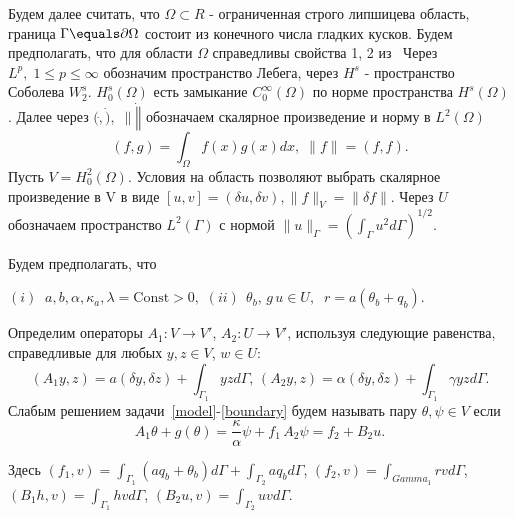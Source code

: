 Будем далее считать, что $\Omega \subset R$ - ограниченная строго липшицева область,
граница $\Gamma \equals \partial \Omega$ состоит из конечного числа гладких кусков.
Будем предполагать, что для области $\Omega$ справедливы свойства 1, 2 из~\cite{}
Через $L^p, \; 1 \leq p \leq \infty$ обозначим пространство Лебега, через $H^s$ - пространство Соболева $W^s_2$.
$H^s_0(\Omega)$ есть замыкание $C^\infty_0(\Omega)$ по норме пространства $H^s(\Omega)$.
Далее через $(\dot, \dot), \; \| \dot \|$ обозначаем скалярное произведение и норму в $L^2(\Omega)$
\[
    (f, g) = \int_\Omega f(x)g(x)dx, \; \| f \| = (f, f).
\]
Пусть $V = H^2_0(\Omega)$.
Условия на область \Omega позволяют выбрать скалярное произведение в V в виде
$[u, v] = (\delta u, \delta v), \| f \|_V = \| \delta f \|$.
Через $U$ обозначаем пространство $L^2(\Gamma)$ с нормой
$\|u\|_\Gamma=\left(\int_\Gamma u^2 d\Gamma\right)^{1/2}.$

Будем предполагать, что

$(i) \;\; a,b,\alpha,\kappa_a, \lambda =\textrm{Const} > 0 ,$
$(ii) \;\, \theta_b, \,g \, u \in U,\;\; r=a(\theta_b+q_b).$


Определим операторы $A_1\colon V \to V'$, $A_2\colon U \to V'$, используя
следующие равенства, справедливые для любых $y,z \in V$, $w\in U$:
\[
    (A_1 y,z) = a(\delta y, \delta z) + \int_\Gamma_1 yz d\Gamma, \,
    (A_2 y, z) = \alpha (\delta y, \delta z) + \int_\Gamma_1 \gamma yz d\Gamma.
\]
Слабым решением задачи~\eqref{model}-\eqref{boundary} будем называть
пару $\theta, \psi \in V$ если
\begin{equation}
    \label{weak}
    A_1\theta  + g(\theta) = \frac{\kappa}{\alpha} \psi + f_1 \,
    A_2\psi = f_2 + B_2 u.
\end{equation}

Здесь
$(f_1, v) = \int_{\Gamma_1} (a q_b + \theta_b)d\Gamma + \int_{\Gamma_2} a q_b d\Gamma$,
$(f_2, v) = \int_{Gamma_1} r v d\Gamma$,
$(B_1 h,v) = \int_{\Gamma_1} h v d\Gamma$,
$(B_2 u, v) = \int_{\Gamma_2} u v d\Gamma$.


